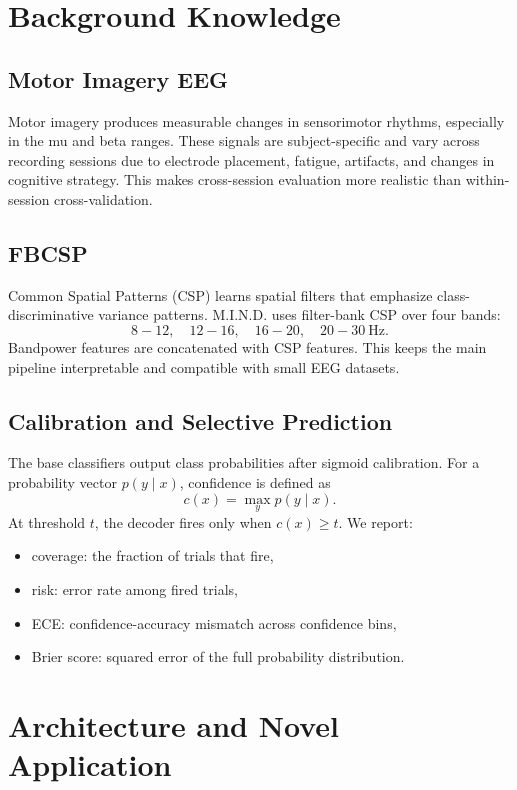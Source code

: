\documentclass[11pt]{article}
\begin{document}
\section{Background Knowledge}

\subsection{Motor Imagery EEG}

Motor imagery produces measurable changes in sensorimotor rhythms, especially
in the mu and beta ranges. These signals are subject-specific and vary across
recording sessions due to electrode placement, fatigue, artifacts, and changes
in cognitive strategy. This makes cross-session evaluation more realistic than
within-session cross-validation.

\subsection{FBCSP}

Common Spatial Patterns (CSP) learns spatial filters that emphasize
class-discriminative variance patterns. M.I.N.D. uses filter-bank CSP over
four bands:
\[
  8\!-\!12,\quad 12\!-\!16,\quad 16\!-\!20,\quad 20\!-\!30\ \mathrm{Hz}.
\]
Bandpower features are concatenated with CSP features. This keeps the main
pipeline interpretable and compatible with small EEG datasets.

\subsection{Calibration and Selective Prediction}

The base classifiers output class probabilities after sigmoid calibration.
For a probability vector \(p(y \mid x)\), confidence is defined as
\[
  c(x) = \max_y p(y \mid x).
\]
At threshold \(t\), the decoder fires only when \(c(x) \geq t\). We report:
\begin{itemize}
  \item coverage: the fraction of trials that fire,
  \item risk: error rate among fired trials,
  \item ECE: confidence-accuracy mismatch across confidence bins,
  \item Brier score: squared error of the full probability distribution.
\end{itemize}

\section{Architecture and Novel Application}
\end{document}
